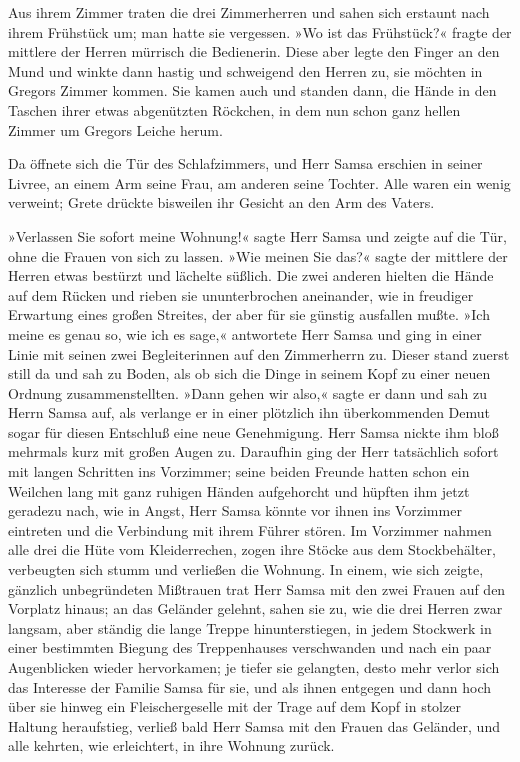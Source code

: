 Aus ihrem Zimmer traten die drei Zimmerherren und sahen sich erstaunt
nach ihrem Frühstück um; man hatte sie vergessen. »Wo ist das
Frühstück?« fragte der mittlere der Herren mürrisch die Bedienerin.
Diese aber legte den Finger an den Mund und winkte dann hastig und
schweigend den Herren zu, sie möchten in Gregors Zimmer kommen. Sie
kamen auch und standen dann, die Hände in den Taschen ihrer etwas
abgenützten Röckchen, in dem nun schon ganz hellen Zimmer um Gregors
Leiche herum.

Da öffnete sich die Tür des Schlafzimmers, und Herr Samsa erschien in
seiner Livree, an einem Arm seine Frau, am anderen seine Tochter. Alle
waren ein wenig verweint; Grete drückte bisweilen ihr Gesicht an den Arm
des Vaters.

»Verlassen Sie sofort meine Wohnung!« sagte Herr Samsa und zeigte auf
die Tür, ohne die Frauen von sich zu lassen. »Wie meinen Sie das?« sagte
der mittlere der Herren etwas bestürzt und lächelte süßlich. Die zwei
anderen hielten die Hände auf dem Rücken und rieben sie ununterbrochen
aneinander, wie in freudiger Erwartung eines großen Streites, der aber
für sie günstig ausfallen mußte. »Ich meine es genau so, wie ich es
sage,« antwortete Herr Samsa und ging in einer Linie mit seinen zwei
Begleiterinnen auf den Zimmerherrn zu. Dieser stand zuerst still da und
sah zu Boden, als ob sich die Dinge in seinem Kopf zu einer neuen
Ordnung zusammenstellten. »Dann gehen wir also,« sagte er dann und sah
zu Herrn Samsa auf, als verlange er in einer plötzlich ihn überkommenden
Demut sogar für diesen Entschluß eine neue Genehmigung. Herr Samsa
nickte ihm bloß mehrmals kurz mit großen Augen zu. Daraufhin ging der
Herr tatsächlich sofort mit langen Schritten ins Vorzimmer; seine beiden
Freunde hatten schon ein Weilchen lang mit ganz ruhigen Händen
aufgehorcht und hüpften ihm jetzt geradezu nach, wie in Angst, Herr
Samsa könnte vor ihnen ins Vorzimmer eintreten und die Verbindung mit
ihrem Führer stören. Im Vorzimmer nahmen alle drei die Hüte vom
Kleiderrechen, zogen ihre Stöcke aus dem Stockbehälter, verbeugten sich
stumm und verließen die Wohnung. In einem, wie sich zeigte, gänzlich
unbegründeten Mißtrauen trat Herr Samsa mit den zwei Frauen auf den
Vorplatz hinaus; an das Geländer gelehnt, sahen sie zu, wie die drei
Herren zwar langsam, aber ständig die lange Treppe hinunterstiegen, in
jedem Stockwerk in einer bestimmten Biegung des Treppenhauses
verschwanden und nach ein paar Augenblicken wieder hervorkamen; je
tiefer sie gelangten, desto mehr verlor sich das Interesse der Familie
Samsa für sie, und als ihnen entgegen und dann hoch über sie hinweg ein
Fleischergeselle mit der Trage auf dem Kopf in stolzer Haltung
heraufstieg, verließ bald Herr Samsa mit den Frauen das Geländer, und
alle kehrten, wie erleichtert, in ihre Wohnung zurück.

